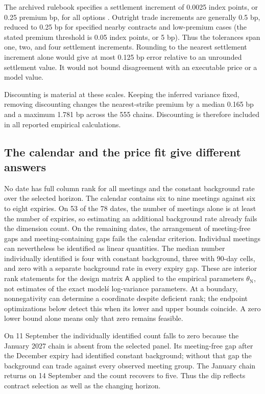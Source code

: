 The archived rulebook specifies a settlement increment of 0.0025 index points, or 0.25 premium bp, for all options \citep[Rule 460A01.C]{cme2026sr3options}. Outright trade increments are generally 0.5 bp, reduced to 0.25 bp for specified nearby contracts and low-premium cases (the stated premium threshold is 0.05 index points, or 5 bp). Thus the tolerances span one, two, and four settlement increments. Rounding to the nearest settlement increment alone would give at most 0.125 bp error relative to an unrounded settlement value. It would not bound disagreement with an executable price or a model value.

Discounting is material at these scales. Keeping the inferred variance fixed, removing discounting changes the nearest-strike premium by a median 0.165 bp and a maximum 1.781 bp across the 555 chains. Discounting is therefore included in all reported empirical calculations.

\subsection{The calendar and the price fit give different answers}
No date has full column rank for all meetings and the constant background rate over the selected horizon. The calendar contains six to nine meetings against six to eight expiries. On 53 of the 78 dates, the number of meetings alone is at least the number of expiries, so estimating an additional background rate already fails the dimension count. On the remaining dates, the arrangement of meeting-free gaps and meeting-containing gaps fails the calendar criterion. Individual meetings can nevertheless be identified as linear quantities. The median number individually identified is four with constant background, three with 90-day cells, and zero with a separate background rate in every expiry gap. These are interior rank statements for the design matrix $\mathsf A$ applied to the empirical parameters $\theta_{\mathrm N}$, not estimates of the exact model\'s log-variance parameters. At a boundary, nonnegativity can determine a coordinate despite deficient rank; the endpoint optimizations below detect this when its lower and upper bounds coincide. A zero lower bound alone means only that zero remains feasible.

On 11 September the individually identified count falls to zero because the January 2027 chain is absent from the selected panel. Its meeting-free gap after the December expiry had identified constant background; without that gap the background can trade against every observed meeting group. The January chain returns on 14 September and the count recovers to five. Thus the dip reflects contract selection as well as the changing horizon.

